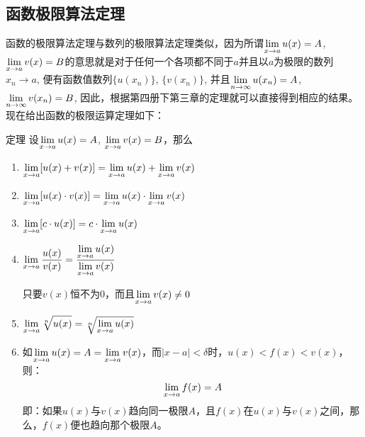 \subsection{函数极限算法定理}
函数的极限算法定理与数列的极限算法定理类似，因为所谓$\displaystyle\lim_{x\to a}u(x)=A$, $\displaystyle\lim_{x\to a}v(x)=B$的意思就是对于任何一个各项都不同于$a$并且以$a$为极限的数列$x_n\to a$, 便有函数值数列$\{u(x_n)\}$, $\{v(x_n)\}$, 并且$\displaystyle\lim_{n\to \infty}u(x_n)=A$, 
$\displaystyle\lim_{n\to \infty} v(x_n)=B$, 因此，根据第四册下第三章的定理就可以直接得到相应的结果。现在给出函数的极限运算定理如下：

\begin{blk}{定理}
设$\displaystyle\lim_{x\to a}u(x)=A$, $\displaystyle\lim_{x\to a}v(x)=B$，那么
\begin{enumerate}
    \item $\displaystyle\lim_{x\to a}[u(x)+v(x)]=\displaystyle\lim_{x\to a}u(x)+\displaystyle\lim_{x\to a}v(x)$
    \item $\displaystyle\lim_{x\to a}[u(x)\cdot v(x)]=\displaystyle\lim_{x\to a} u(x)\cdot \displaystyle\lim_{x\to a}v(x)$
    \item $\displaystyle\lim_{x\to a}[c\cdot u(x)]=c\cdot \displaystyle\lim_{x\to a}u(x)$
    \item $\displaystyle\lim_{x\to a}\dfrac{u(x)}{v(x)}=\dfrac{\displaystyle\lim_{x\to a}u(x)}{\displaystyle\lim_{x\to a}v(x)}$ 
    
    只要$v(x)$恒不为0，而且$\displaystyle\lim_{x\to a}v(x)\ne 0$
    \item $\displaystyle\lim_{x\to a}\sqrt[n]{u(x)}=\sqrt[n]{\displaystyle\lim_{x\to a}u(x)}$
    \item 如$\displaystyle\lim_{x\to a}u(x)=A=\displaystyle\lim_{x\to a} v(x)$，而$|x-a|<\delta$时，$u(x)<f(x)<v(x)$，则：
    \[\displaystyle\lim_{x\to a} f(x)=A\]
    即：如果$u(x)$与$v(x)$趋向同一极限$A$，且$f(x)$在$u(x)$与$v(x)$之间，那么，$f(x)$便也趋向那个极限$A$。
\end{enumerate}
\end{blk}




